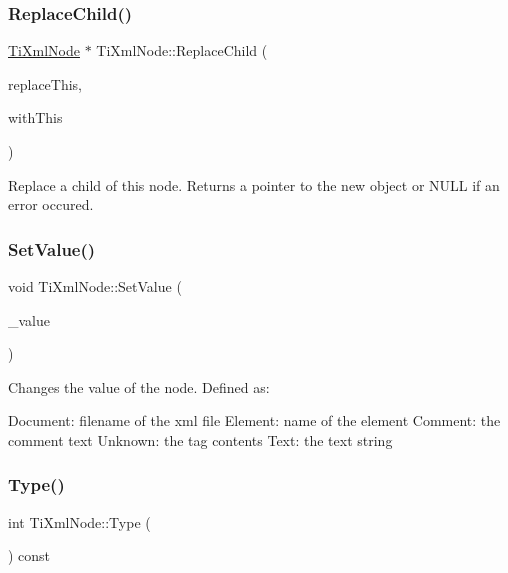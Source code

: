 \subsubsection{\texorpdfstring{Replace\+Child()}{ReplaceChild()}}
{\footnotesize\ttfamily \hyperlink{class_ti_xml_node}{Ti\+Xml\+Node} $\ast$ Ti\+Xml\+Node\+::\+Replace\+Child (\begin{DoxyParamCaption}\item[{\hyperlink{class_ti_xml_node}{Ti\+Xml\+Node} $\ast$}]{replace\+This,  }\item[{const \hyperlink{class_ti_xml_node}{Ti\+Xml\+Node} \&}]{with\+This }\end{DoxyParamCaption})}

Replace a child of this node. Returns a pointer to the new object or N\+U\+LL if an error occured. \mbox{\label{class_ti_xml_node_a2a38329ca5d3f28f98ce932b8299ae90}} 
\subsubsection{\texorpdfstring{Set\+Value()}{SetValue()}}
{\footnotesize\ttfamily void Ti\+Xml\+Node\+::\+Set\+Value (\begin{DoxyParamCaption}\item[{const char $\ast$}]{\+\_\+value }\end{DoxyParamCaption})\hspace{0.3cm}{\ttfamily [inline]}}

Changes the value of the node. Defined as\+: \begin{DoxyVerb}Document:   filename of the xml file
Element:    name of the element
Comment:    the comment text
Unknown:    the tag contents
Text:       the text string
\end{DoxyVerb}
 \mbox{\label{class_ti_xml_node_a0f4dd916b2afc2ab2f1a84f3e2b8fd5d}} 
\subsubsection{\texorpdfstring{Type()}{Type()}}
{\footnotesize\ttfamily int Ti\+Xml\+Node\+::\+Type (\begin{DoxyParamCaption}{ }\end{DoxyParamCaption}) const\hspace{0.3cm}{\ttfamily [inline]}}

